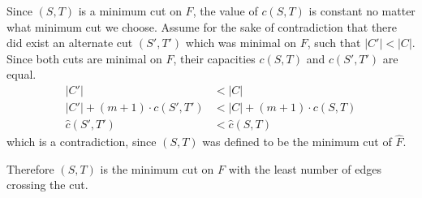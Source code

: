 \documentclass{article}
\begin{document}
\begin{solution}
\begin{enumerate}[label = (\alph*)]
    Since $(S, T)$ is a minimum cut on $F$, the value of $c(S,T)$ is constant no matter what minimum cut we choose.
    Assume for the sake of contradiction that there did exist an alternate cut $(S',T')$ which was minimal on $F$, 
    such that $|C'|<|C|$. Since both cuts are minimal on $F$, their capacities $c(S,T)$ and $c(S',T')$ are equal.
    \begin{align*}
        |C'|&< |C|\\
        |C'|+(m+1)\cdot c(S',T') &< |C|+(m+1)\cdot c(S,T)\\
        \hat{c}(S',T')&< \hat{c}(S,T)
    \end{align*}
    which is a contradiction, since $(S,T)$ was defined to be the minimum cut of $\hat{F}$.

    Therefore $(S,T)$ is the minimum cut on $F$ with the least number of edges crossing the cut.


\end{enumerate}
\end{solution}
\end{document}
